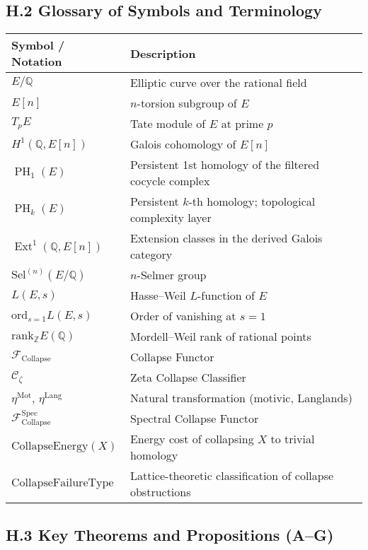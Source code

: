 \documentclass[11pt]{article}
\DeclareMathOperator{\Ext}{Ext}
\DeclareMathOperator{\PH}{PH}
\newcommand{\QQ}{\mathbb{Q}}
\newcommand{\ZZ}{\mathbb{Z}}
\begin{document}
\subsection*{H.2 Glossary of Symbols and Terminology}

\begin{center}
\begin{tabular}{|l|l|}
\hline
\textbf{Symbol / Notation} & \textbf{Description} \\
\hline
$E/\QQ$ & Elliptic curve over the rational field \\
$E[n]$ & $n$-torsion subgroup of $E$ \\
$T_p E$ & Tate module of $E$ at prime $p$ \\
$H^1(\QQ, E[n])$ & Galois cohomology of $E[n]$ \\
$\PH_1(E)$ & Persistent 1st homology of the filtered cocycle complex \\
$\PH_k(E)$ & Persistent $k$-th homology; topological complexity layer \\
$\Ext^1(\QQ, E[n])$ & Extension classes in the derived Galois category \\
$\mathrm{Sel}^{(n)}(E/\QQ)$ & $n$-Selmer group \\
$L(E,s)$ & Hasse--Weil $L$-function of $E$ \\
$\mathrm{ord}_{s=1} L(E,s)$ & Order of vanishing at $s=1$ \\
$\mathrm{rank}_{\ZZ} E(\QQ)$ & Mordell--Weil rank of rational points \\
$\mathcal{F}_{\mathrm{Collapse}}$ & Collapse Functor \\
$\mathcal{C}_\zeta$ & Zeta Collapse Classifier \\
$\eta^{\mathrm{Mot}}$, $\eta^{\mathrm{Lang}}$ & Natural transformation (motivic, Langlands) \\
$\mathcal{F}^{\mathrm{Spec}}_{\mathrm{Collapse}}$ & Spectral Collapse Functor \\
$\mathrm{CollapseEnergy}(X)$ & Energy cost of collapsing $X$ to trivial homology \\
$\mathrm{CollapseFailureType}$ & Lattice-theoretic classification of collapse obstructions \\
\hline
\end{tabular}
\end{center}

\subsection*{H.3 Key Theorems and Propositions (A--G)}
\end{document}
